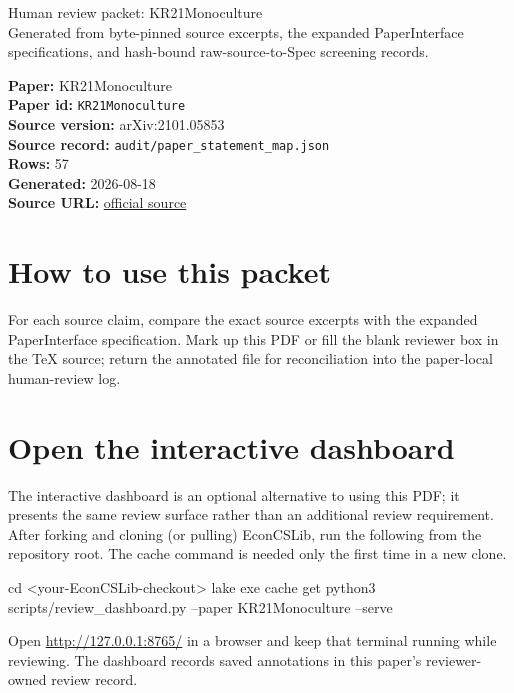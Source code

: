 \documentclass[10pt]{article}
\begin{document}
\fontsize{9}{10}\selectfont

\begin{center}
{\LARGE Human review packet: KR21Monoculture}\\[0.35em]
\small Generated from byte-pinned source excerpts, the expanded PaperInterface
specifications, and hash-bound raw-source-to-Spec screening records.
\end{center}

\noindent\textbf{Paper:} KR21Monoculture\\
\textbf{Paper id:} \texttt{KR21Monoculture}\\
\textbf{Source version:} arXiv:2101.05853\\
\textbf{Source record:} \texttt{audit/paper\_statement\_map.json}\\
\textbf{Rows:} 57\\
\textbf{Generated:} 2026-08-18\\
\textbf{Source URL:} \href{https://arxiv.org/abs/2101.05853}{official source}

\noindent{}\par



\section*{How to use this packet}
For each source claim, compare the exact source excerpts with the expanded
PaperInterface specification. Mark up this PDF or fill the blank reviewer box in the TeX source;
return the annotated file for reconciliation into the paper-local human-review
log.

\section*{Open the interactive dashboard}
The interactive dashboard is an optional alternative to using this PDF; it
presents the same review surface rather than an additional review requirement.
After forking and cloning (or pulling) EconCSLib, run the following from the
repository root. The cache command is needed only the first time in a new clone.
\begin{ReviewVerbatim}
cd <your-EconCSLib-checkout>
lake exe cache get
python3 scripts/review_dashboard.py --paper KR21Monoculture --serve
\end{ReviewVerbatim}
Open \url{http://127.0.0.1:8765/} in a browser and keep that terminal running
while reviewing. The dashboard records saved annotations in this paper's
reviewer-owned review record.
\end{document}
